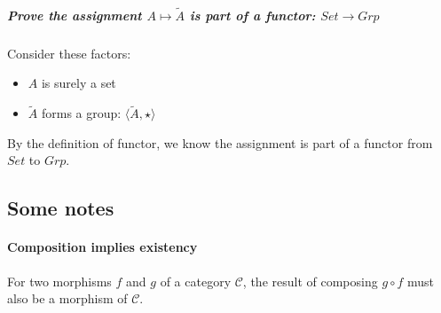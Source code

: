 \documentclass[11pt]{article}
\begin{document}
\subparagraph{Prove the assignment $A \mapsto \tilde{A}$ is part of a functor:
$Set \rightarrow Grp$}

Consider these factors:

\begin{itemize}
  \item{$A$ is surely a set}
  \item{$\tilde{A}$ forms a group: $\langle \tilde{A}, \star \rangle$}
\end{itemize}

By the definition of functor, we know the assignment is part of a functor
from $Set$ to $Grp$.

\subsection{Some notes}

\paragraph{Composition implies existency}
For two morphisms $f$ and $g$ of a category $\mathcal{C}$, the result of composing $g \circ f$
must also be a morphism of $\mathcal{C}$.
\end{document}
